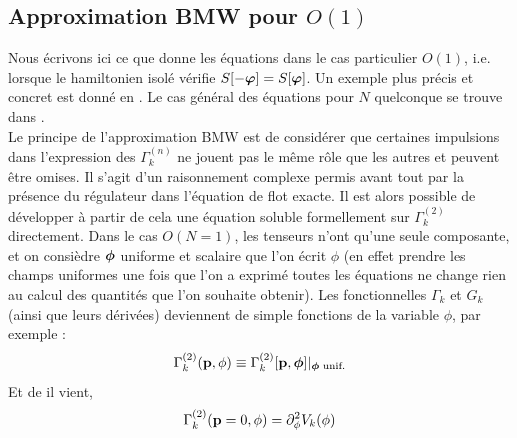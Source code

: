\documentclass[10pt]{article}
\begin{document}
\begin{multicols}{2}
\subsection{Approximation BMW pour $O(1)$} 
 
Nous écrivons ici ce que donne les équations dans le cas particulier $O(1)$, i.e. lorsque le hamiltonien isolé vérifie $S[-\boldsymbol{ \varphi}] = S[\boldsymbol{ \varphi}]$. Un exemple plus précis et concret est donné en . Le cas général des équations pour $N$ quelconque se trouve dans \cite{benitez2012nonperturbative}.\\ 

Le principe de l'approximation BMW \cite{Blaizot} est de considérer que certaines impulsions dans l'expression des $\Gamma_k^{(n)}$ ne jouent pas le même rôle que les autres et peuvent être omises. Il s'agit d'un raisonnement complexe permis avant tout par la présence du régulateur dans l'équation de flot exacte. Il est alors possible de développer à partir de cela une équation soluble formellement sur $\Gamma_k^{(2)}$ directement. Dans le cas $O(N=1)$, les tenseurs n'ont qu'une seule composante, et on consièdre $\boldsymbol{ \phi}$ uniforme et scalaire que l'on écrit $\phi$ (en effet prendre les champs uniformes une fois que l'on a exprimé toutes les équations ne change rien au calcul des quantités que l'on souhaite obtenir). Les fonctionnelles $\Gamma_k$ et $G_k$ (ainsi que leurs dérivées) deviennent de simple fonctions de la variable $\phi$, par exemple : 
\begin{equation}
	\Gamma_{k}^{(2)}({\bf p}, \phi) \equiv \Gamma_{k}^{(2)}[{\bf p}, \boldsymbol{ \phi}] {|}_{\boldsymbol{ \phi} \text{ unif.}}
\end{equation}
Et de  il vient,
\begin{equation}
	\Gamma_{k}^{(2)}({\bf p} = 0, \phi) = \partial_{\phi}^2 V_k(\phi)
\end{equation}
\vspace*{11pt}



\end{multicols}
\end{document}
